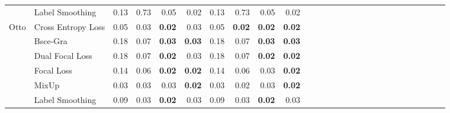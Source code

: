 \begin{table}[t]
{\begin{tabular}{ll *{25}{r}}
 & Label Smoothing & 0.13 & 0.73 & 0.05 & 0.02 & 0.13 & 0.73 & 0.05 & 0.02 \\
\cline{1-10}
\multirow[t]{4}{*}{Otto} 
 & Cross Entropy Loss & 0.05 & 0.03 & \textbf{0.02} & 0.03 & 0.05 & \textbf{0.02} & \textbf{0.02} & \textbf{0.02} \\
 & Bsce-Gra & 0.18 & 0.07 & \textbf{0.03} & \textbf{0.03} & 0.18 & 0.07 & \textbf{0.03} & \textbf{0.03} \\
 & Dual Focal Loss & 0.18 & 0.07 & \textbf{0.02} & 0.03 & 0.18 & 0.07 & \textbf{0.02} & \textbf{0.02} \\
 & Focal Loss & 0.14 & 0.06 & \textbf{0.02} & \textbf{0.02} & 0.14 & 0.06 & 0.03 & \textbf{0.02} \\
 & MixUp & 0.03 & 0.03 & 0.03 & \textbf{0.02} & 0.03 & 0.02 & 0.03 & \textbf{0.02} \\
 & Label Smoothing & 0.09 & 0.03 & \textbf{0.02} & 0.03 & 0.09 & 0.03 & \textbf{0.02} & 0.03 \\
\cline{1-10}
\bottomrule
\end{tabular}
}
\end{table}